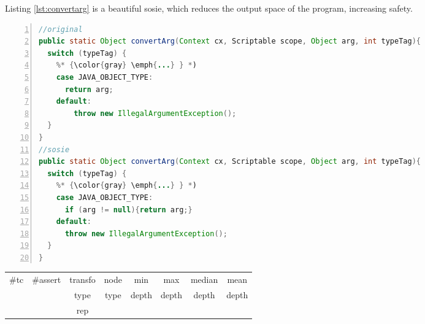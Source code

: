 Listing \ref{lst:convertarg} is a beautiful sosie, which reduces the output space of the program, increasing safety.

\begin{minipage}{\columnwidth}
\begin{lstlisting}[caption={\texttt{convertArg} in Rhino and a sosie},label={lst:convertarg},language=java,numbers=left]
//original
public static Object convertArg(Context cx, Scriptable scope, Object arg, int typeTag){
  switch (typeTag) {
    %* {\color{gray} \emph{...} } *)
    case JAVA_OBJECT_TYPE:
      return arg;
    default:
        throw new IllegalArgumentException();
  }
}
//sosie
public static Object convertArg(Context cx, Scriptable scope, Object arg, int typeTag){
  switch (typeTag) {
    %* {\color{gray} \emph{...} } *)
    case JAVA_OBJECT_TYPE:
      if (arg != null){return arg;}
    default:
      throw new IllegalArgumentException();
  }
}

\end{lstlisting}
\tabcolsep=0.11cm
\begin{tabular}{>{\small}c>{\small}c>{\small}c>{\small}c>{\small}c>{\small}c>{\small}c>{\small}c}
\hline
\rowcolor{lightgray} \#tc & \#assert & transfo & node & min & max & median & mean   \\
\rowcolor{lightgray}  & & type & type & depth  & depth & depth & depth  \\ 
\hline
&  & rep &  &  &  &  & \\
\hline
\end{tabular}
\end{minipage}